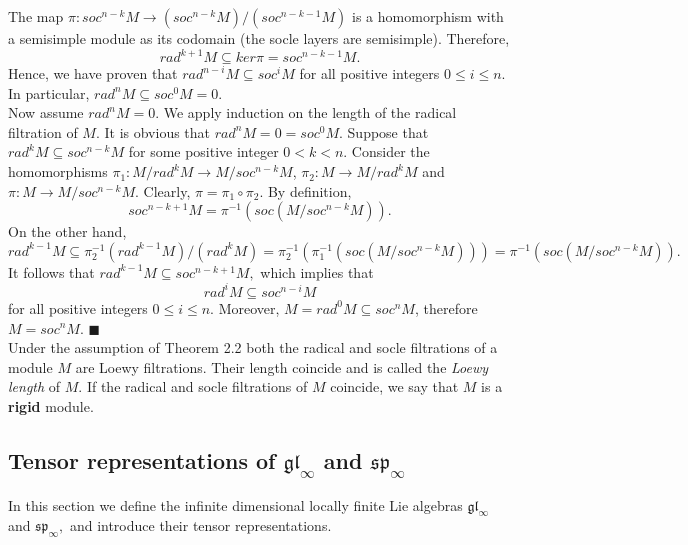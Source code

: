 The map $\pi:soc^{n-k}M\rightarrow (soc^{n-k}M)/(soc^{n-k-1}M)$ is a homomorphism with a semisimple module as its codomain (the socle layers are semisimple). Therefore,
$$rad^{k+1}M\subseteq ker\pi=soc^{n-k-1}M.$$Hence, we have proven that $rad^{n-i}M\subseteq soc^i M$ for all positive integers $0\le i\le n$. In particular, $rad^nM\subseteq soc^{0}M=0$. 
\vspace{2mm}
\\Now assume $rad^nM=0$. We apply induction on the length of the radical filtration of $M$. It is obvious that $rad^nM=0=soc^0M$. Suppose that $rad^kM\subseteq soc^{n-k}M$ for some positive integer $0<k<n$. Consider the homomorphisms
$\pi_1:M/rad^kM\rightarrow M/soc^{n-k}M$, $\pi_2:M\rightarrow M/rad^{k}M$ and $\pi:M\rightarrow M/soc^{n-k}M$. Clearly, $\pi=\pi_1 \circ\pi_2$.
By definition, $$soc^{n-k+1}M=\pi^{-1}(soc(M/soc^{n-k}M)).$$
On the other hand, $$rad^{k-1}M\subseteq \pi_{2}^{-1}(rad^{k-1}M)/(rad^kM)=\pi_{2}^{-1}(\pi_{1}^{-1}(soc(M/soc^{n-k}M)))=\pi^{-1}(soc(M/soc^{n-k}M)).$$
It follows that $rad^{k-1}M\subseteq soc^{n-k+1}M,$ which implies that
$$rad^{i}M\subseteq soc^{n-i}M$$ for all positive integers $0\leq i\leq n$. Moreover, $M=rad^0M\subseteq soc^{n}M$, therefore $ M=soc^nM$. $\blacksquare$
\\Under the assumption of Theorem 2.2 both the radical and socle filtrations of a module $M$ are Loewy filtrations. Their length coincide and is called the \textit{Loewy length} of $M$. If the radical and socle filtrations of $M$ coincide, we say that $M$ is a \textbf{rigid} module.

\subsection{Tensor representations of  $\mathfrak{gl}_{\infty}$ and $\mathfrak{sp}_{\infty}$ }
In this section we define the infinite dimensional locally finite Lie algebras $\mathfrak{gl}_{\infty}$ and $\mathfrak{sp}_{\infty},$ and introduce their tensor representations. 



